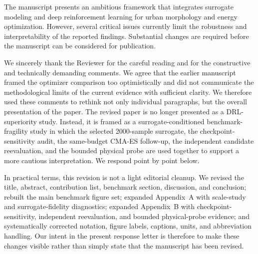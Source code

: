 %
%

\begin{ReviewerComment}
The manuscript presents an ambitious framework that integrates surrogate modeling and deep reinforcement learning for urban morphology and energy optimization. However, several critical issues currently limit the robustness and interpretability of the reported findings. Substantial changes are required before the manuscript can be considered for publication.
\end{ReviewerComment}
%
\begin{Answer}
We sincerely thank the Reviewer for the careful reading and for the constructive and technically demanding comments. We agree that the earlier manuscript framed the optimizer comparison too optimistically and did not communicate the methodological limits of the current evidence with sufficient clarity. We therefore used these comments to rethink not only individual paragraphs, but the overall presentation of the paper. The revised paper is no longer presented as a DRL-superiority study. Instead, it is framed as a surrogate-conditioned benchmark-fragility study in which the selected 2000-sample surrogate, the checkpoint-sensitivity audit, the same-budget CMA-ES follow-up, the independent candidate reevaluation, and the bounded physical probe are used together to support a more cautious interpretation. We respond point by point below.

In practical terms, this revision is not a light editorial cleanup. We revised the title, abstract, contribution list, benchmark section, discussion, and conclusion; rebuilt the main benchmark figure set; expanded Appendix~A with scale-study and surrogate-fidelity diagnostics; expanded Appendix~B with checkpoint-sensitivity, independent reevaluation, and bounded physical-probe evidence; and systematically corrected notation, figure labels, captions, units, and abbreviation handling. Our intent in the present response letter is therefore to make these changes visible rather than simply state that the manuscript has been revised.
\end{Answer}

